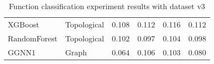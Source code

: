 \begin{table}[H]
{\begin{tabular}{|llrrrr|}
  

  XGBoost &           Topological &     0.108 &                    0.112 &                 0.116 &     0.112 \\
  
  RandomForest &           Topological &     0.102 &                    0.097 &                 0.104 &     0.098 \\
  GGNN1 &                  Graph &     0.064 &                    0.106 &                 0.103 &     0.080 \\
  
  
                 
\hline
\end{tabular}
}\label{FN_exp_v3}\caption{Function classification experiment results with dataset v3}
\end{table}
